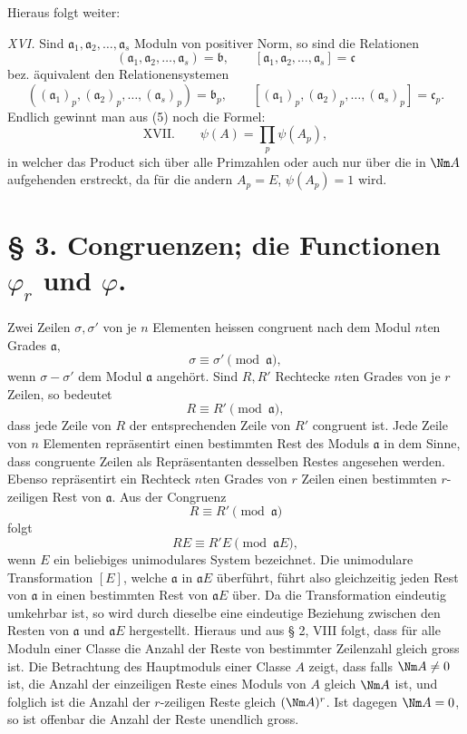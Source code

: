 Hieraus folgt weiter:

\emph{XVI.} Sind $\mathfrak a_1,\mathfrak a_2,\ldots,\mathfrak a_s$ Moduln von positiver Norm, so sind die Relationen
\[
 (\mathfrak a_1,\mathfrak a_2,\ldots,\mathfrak a_s)=\mathfrak b,
 \qquad
 [\mathfrak a_1,\mathfrak a_2,\ldots,\mathfrak a_s]=\mathfrak c
\]
bez. äquivalent den Relationensystemen
\[
 ((\mathfrak a_1)_p,(\mathfrak a_2)_p,\ldots,(\mathfrak a_s)_p)=\mathfrak b_p,
 \qquad
 [(\mathfrak a_1)_p,(\mathfrak a_2)_p,\ldots,(\mathfrak a_s)_p]=\mathfrak c_p.
\]
Endlich gewinnt man aus (5) noch die Formel:
\[
\text{XVII.}\qquad \psi(A)=\prod_p \psi(A_p),
\]
in welcher das Product sich über alle Primzahlen oder auch nur über die in $\Nm A$ aufgehenden erstreckt, da für die andern $A_p=E$, $\psi(A_p)=1$ wird.

\section*{§ 3. Congruenzen; die Functionen $\varphi_r$ und $\varphi$.}

Zwei Zeilen $\sigma,\sigma'$ von je $n$ Elementen heissen congruent nach dem Modul $n$ten Grades $\mathfrak a$,
\[
 \sigma\equiv\sigma'\pmod{\mathfrak a},
\]
wenn $\sigma-\sigma'$ dem Modul $\mathfrak a$ angehört. Sind $R,R'$ Rechtecke $n$ten Grades von je $r$ Zeilen, so bedeutet
\[
 R\equiv R'\pmod{\mathfrak a},
\]
dass jede Zeile von $R$ der entsprechenden Zeile von $R'$ congruent ist. Jede Zeile von $n$ Elementen repräsentirt einen bestimmten Rest des Moduls $\mathfrak a$ in dem Sinne, dass congruente Zeilen als Repräsentanten desselben Restes angesehen werden. Ebenso repräsentirt ein Rechteck $n$ten Grades von $r$ Zeilen einen bestimmten $r$-zeiligen Rest von $\mathfrak a$. Aus der Congruenz
\[
 R\equiv R'\pmod{\mathfrak a}
\]
folgt
\[
 RE\equiv R'E\pmod{\mathfrak aE},
\]
wenn $E$ ein beliebiges unimodulares System bezeichnet. Die unimodulare Transformation $[E]$, welche $\mathfrak a$ in $\mathfrak aE$ überführt, führt also gleichzeitig jeden Rest von $\mathfrak a$ in einen bestimmten Rest von $\mathfrak aE$ über. Da die Transformation eindeutig umkehrbar ist, so wird durch dieselbe eine eindeutige Beziehung zwischen den Resten von $\mathfrak a$ und $\mathfrak aE$ hergestellt. Hieraus und aus § 2, VIII folgt, dass für alle Moduln einer Classe die Anzahl der Reste von bestimmter Zeilenzahl gleich gross ist. Die Betrachtung des Hauptmoduls einer Classe $A$ zeigt, dass falls $\Nm A\ne 0$ ist, die Anzahl der einzeiligen Reste eines Moduls von $A$ gleich $\Nm A$ ist, und folglich ist die Anzahl der $r$-zeiligen Reste gleich $(\Nm A)^r$. Ist dagegen $\Nm A=0$, so ist offenbar die Anzahl der Reste unendlich gross.

